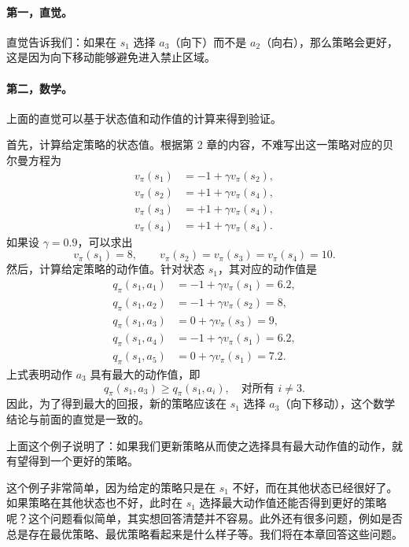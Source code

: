 \paragraph{第一，直觉。}直觉告诉我们：如果在 $s_1$ 选择 $a_3$（向下）而不是 $a_2$（向右），那么策略会更好，这是因为向下移动能够避免进入禁止区域。

\paragraph{第二，数学。}上面的直觉可以基于状态值和动作值的计算来得到验证。

首先，计算给定策略的状态值。根据第 2 章的内容，不难写出这一策略对应的贝尔曼方程为
\begin{align}
  v_\pi(s_1) &= -1 + \gamma v_\pi(s_2),\\
  v_\pi(s_2) &= +1 + \gamma v_\pi(s_4),\\
  v_\pi(s_3) &= +1 + \gamma v_\pi(s_4),\\
  v_\pi(s_4) &= +1 + \gamma v_\pi(s_4).
\end{align}
如果设 $\gamma = 0.9$，可以求出
\begin{equation}
  v_\pi(s_1) = 8, \qquad v_\pi(s_2) = v_\pi(s_3) = v_\pi(s_4) = 10.
\end{equation}
然后，计算给定策略的动作值。针对状态 $s_1$，其对应的动作值是
\begin{align}
  q_\pi(s_1, a_1) &= -1 + \gamma v_\pi(s_1) = 6.2,\\
  q_\pi(s_1, a_2) &= -1 + \gamma v_\pi(s_2) = 8,\\
  q_\pi(s_1, a_3) &= 0 + \gamma v_\pi(s_3) = 9,\\
  q_\pi(s_1, a_4) &= -1 + \gamma v_\pi(s_1) = 6.2,\\
  q_\pi(s_1, a_5) &= 0 + \gamma v_\pi(s_1) = 7.2.
\end{align}
上式表明动作 $a_3$ 具有最大的动作值，即
\begin{equation}
  q_\pi(s_1, a_3) \geqslant q_\pi(s_1, a_i), \quad \text{对所有 } i \neq 3.
\end{equation}
因此，为了得到最大的回报，新的策略应该在 $s_1$ 选择 $a_3$（向下移动），这个数学结论与前面的直觉是一致的。

上面这个例子说明了：如果我们更新策略从而使之选择具有最大动作值的动作，就有望得到一个更好的策略。

这个例子非常简单，因为给定的策略只是在 $s_1$ 不好，而在其他状态已经很好了。如果策略在其他状态也不好，此时在 $s_1$ 选择最大动作值还能否得到更好的策略呢？这个问题看似简单，其实想回答清楚并不容易。此外还有很多问题，例如是否总是存在最优策略、最优策略看起来是什么样子等。我们将在本章回答这些问题。


